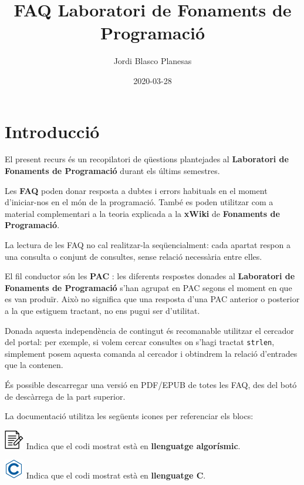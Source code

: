 \documentclass[]{book}
\title{FAQ Laboratori de Fonaments de Programació}
\author{Jordi Blasco Planesas}
\date{2020-03-28}
\begin{document}
\maketitle

{
\setcounter{tocdepth}{1}
\tableofcontents
}
\chapter*{Introducció}\label{introduccio}

El present recurs és un recopilatori de qüestions plantejades al
\textbf{Laboratori de Fonaments de Programació} durant els últims
semestres.

Les \textbf{FAQ} poden donar resposta a dubtes i errors habituals en el
moment d'iniciar-nos en el món de la programació. També es poden
utilitzar com a material complementari a la teoria explicada a la
\textbf{xWiki} de \textbf{Fonaments de Programació}.

La lectura de les FAQ no cal realitzar-la seqüencialment: cada apartat
respon a una consulta o conjunt de consultes, sense relació necessària
entre elles.

El fil conductor són les \textbf{PAC} : les diferents respostes donades
al \textbf{Laboratori de Fonaments de Programació} s'han agrupat en PAC
segons el moment en que es van produïr. Això no significa que una
resposta d'una PAC anterior o posterior a la que estiguem tractant, no
ens pugui ser d'utilitat.

Donada aquesta independència de contingut és recomanable utilitzar el
cercador del portal: per exemple, si volem cercar consultes on s'hagi
tractat \texttt{strlen}, simplement posem aquesta comanda al cercador i
obtindrem la relació d'entrades que la contenen.

És possible descarregar una versió en PDF/EPUB de totes les FAQ, des del
botó de descàrrega de la part superior.

La documentació utilitza les següents icones per referenciar els blocs:

\includegraphics{./img/alg.png} Indica que el codi mostrat està en
\textbf{llenguatge algorísmic}.

\includegraphics{./img/c.png} Indica que el codi mostrat està en
\textbf{llenguatge C}.
\end{document}
